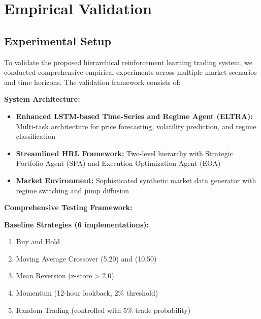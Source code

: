 \documentclass[11pt,a4paper]{article}
\begin{document}
\section{Empirical Validation}

\subsection{Experimental Setup}

To validate the proposed hierarchical reinforcement learning trading system, we conducted comprehensive empirical experiments across multiple market scenarios and time horizons. The validation framework consists of:

\textbf{System Architecture:}
\begin{itemize}
\item \textbf{Enhanced LSTM-based Time-Series and Regime Agent (ELTRA):} Multi-task architecture for price forecasting, volatility prediction, and regime classification
\item \textbf{Streamlined HRL Framework:} Two-level hierarchy with Strategic Portfolio Agent (SPA) and Execution Optimization Agent (EOA)
\item \textbf{Market Environment:} Sophisticated synthetic market data generator with regime switching and jump diffusion

\end{itemize}
\textbf{Comprehensive Testing Framework:}
\textbf{Baseline Strategies (6 implementations):}
\begin{enumerate}
\item Buy and Hold
\item Moving Average Crossover (5,20) and (10,50)
\item Mean Reversion (z-score > 2.0)
\item Momentum (12-hour lookback, 2\% threshold)
\item Random Trading (controlled with 5\% trade probability)

\end{enumerate}
\end{document}
